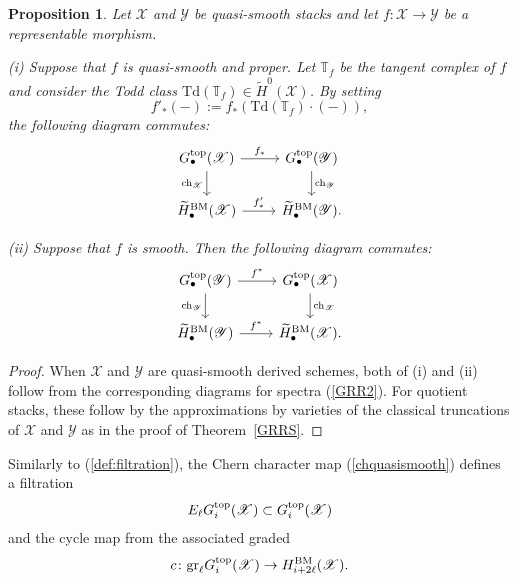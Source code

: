 \documentclass [11pt,oneside,a4paper,mathscr]{amsart}
\newtheorem{prop}[thm]{Proposition}
\theoremstyle{definition}
\newcommand{\X}{\mathscr{X}}
\begin{document}
\begin{prop}\label{propo36}
Let $\X$ and $\mathscr{Y}$ be quasi-smooth stacks and let $f\colon \X\to\mathscr{Y}$ be a representable morphism. 

(i) Suppose that $f$ is quasi-smooth and proper. Let $\mathbb{T}_f$ be the tangent complex of $f$ and consider the Todd class $\mathrm{Td}(\mathbb{T}_f)\in \widetilde{H}^0(\X)$. By setting \[f'_*(-):=f_*(\mathrm{Td}(\mathbb{T}_f)\cdot(-)),\] 
the following diagram commutes:
\begin{equation}\label{GRR}
    \begin{tikzcd}
        G^{\mathrm{top}}_\bullet(\X)\arrow[d, "\mathrm{ch}_\X"']\arrow[r, "f_*"]& G^{\mathrm{top}}_\bullet(\mathscr{Y})\arrow[d, "\mathrm{ch}_{\mathscr{Y}}"]\\
        \widetilde{H}^{\mathrm{BM}}_\bullet(\X)\arrow[r, "f'_*"]& \widetilde{H}^{\mathrm{BM}}_\bullet(\mathscr{Y}).
    \end{tikzcd}
\end{equation}

(ii) Suppose that $f$ is smooth. Then the following diagram commutes:
\begin{equation}\label{diagpull}
    \begin{tikzcd}
        G^{\mathrm{top}}_\bullet(\mathscr{Y})\arrow[d, "\mathrm{ch}_\mathscr{Y}"']\arrow[r, "f^*"]& G^{\mathrm{top}}_\bullet(\mathscr{X})\arrow[d, "\mathrm{ch}_{\mathscr{X}}"]\\
        \widetilde{H}^{\mathrm{BM}}_\bullet(\mathscr{Y})\arrow[r, "f^*"]& \widetilde{H}^{\mathrm{BM}}_\bullet(\mathscr{X}).
    \end{tikzcd}
\end{equation}
\end{prop}
\begin{proof}
    When $\X$ and $\mathscr{Y}$ are quasi-smooth derived schemes, both of (i) and (ii) follow from the corresponding diagrams for spectra (\ref{GRR2}). 
    For quotient stacks, these follow by the approximations by varieties
    of the classical truncations of $\X$ and $\mathscr{Y}$
    as in the proof of Theorem~\ref{GRRS}. 
\end{proof}

Similarly to (\ref{def:filtration}), 
the Chern character map (\ref{chquasismooth})
defines a filtration 
\begin{align*}
    E_{\ell}G_i^{\rm{top}}(\X) \subset G_i^{\rm{top}}(\X)
\end{align*}
and the cycle map 
from the associated graded
\begin{align}\label{cherngraded3}
    c \colon \mathrm{gr}_{\ell}G_i^{\rm{top}}(\X) \to H_{i+2\ell}^{\rm{BM}}(\X). 
\end{align}
\end{document}
